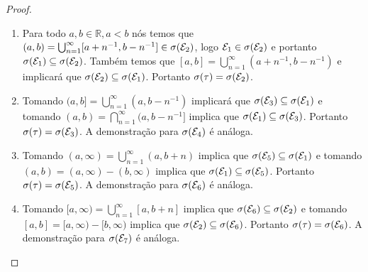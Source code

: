 \begin{proposicao}
\begin{proof}
\begin{enumerate}[label=(\roman*)]
        \item Para todo $a,b \in \mathbb{R}, a < b$ nós temos que $(a,b)= \bigcup_{n=1} ^\infty [a + n^{-1}, b - n^{-1}] \in \sigma(\mathcal{E} _2) $, logo $\mathcal{E}_1 \in \sigma(\mathcal{E} _2)$ e portanto $\sigma(\mathcal{E} _1) \subseteq \sigma(\mathcal{E} _2)$. Também temos que $[a,b] = \bigcup _{n=1} ^\infty (a + n^{-1}, b - n^{-1}) $ e implicará que $ \sigma(\mathcal{E} _2) \subseteq \sigma(\mathcal{E} _1) $. Portanto $\sigma(\tau) = \sigma(\mathcal{E} _2 )$.
        
        \item Tomando $(a,b] = \bigcup _{n=1} ^\infty (a, b- n^{-1}) $ implicará que $\sigma(\mathcal{E} _3) \subseteq \sigma(\mathcal{E} _1) $ e tomando $(a,b) = \bigcap _{n=1} ^\infty (a,b - n^{-1} ]$ implica que $ \sigma(\mathcal{E} _1) \subseteq \sigma(\mathcal{E} _3)$. Portanto $ \sigma(\tau) = \sigma(\mathcal{E} _ 3)$. A demonstração para $\sigma(\mathcal{E} _ 4)$ é análoga.
        
        \item Tomando $(a, \infty) = \bigcup _{n=1} ^\infty (a, b + n) $ implica que $\sigma(\mathcal{E} _5) \subseteq \sigma(\mathcal{E} _1)$ e tomando $(a,b) = (a,\infty) - (b, \infty)$ implica que $\sigma(\mathcal{E} _ 1) \subseteq \sigma(\mathcal{E} _5)$. Portanto  $ \sigma(\tau) = \sigma(\mathcal{E}_5)$. A demonstração para $ \sigma(\mathcal{E} _ 6)$ é análoga.
        
        \item Tomando $[a, \infty ) = \bigcup _{n=1}^\infty [a, b + n]$ implica que $ \sigma(\mathcal{E} _ 6) \subseteq \sigma(\mathcal{E} _ 2)$ e tomando $ [a,b] = [a,\infty ) - [b,\infty)$
        implica que $\sigma(\mathcal{E} _ 2) \subseteq \sigma(\mathcal{E} _6)$. Portanto $\sigma(\tau) = \sigma(\mathcal{E} _ 6)$. A demonstração para $\sigma(\mathcal{E} _7) $ é análoga.
 
        \end{enumerate}

    \end{proof}

\end{proposicao}
       



